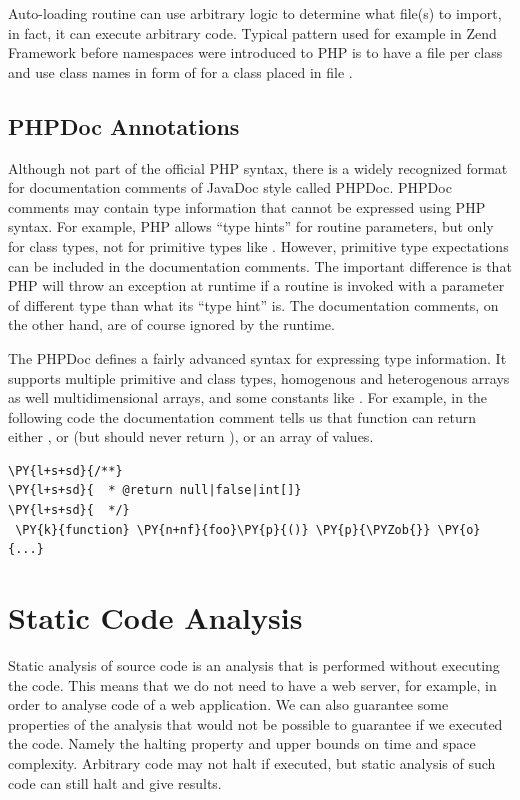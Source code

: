     Auto-loading routine can use arbitrary logic to 
    determine what file(s) to import, in fact, it can 
    execute arbitrary code. Typical 
    pattern used for example in 
    Zend Framework\cite{zendframework} before namespaces were 
    introduced to PHP is to have a file per class and use 
    class names in form of 
     for 
    a class placed in file 
    .
    
    \subsection{PHPDoc Annotations}
    Although not part of the official PHP syntax, 
    there is a widely recognized format for documentation 
    comments of JavaDoc style called PHPDoc. PHPDoc comments 
    may contain type information that cannot be expressed using 
    PHP syntax. For example, PHP allows ``type hints'' 
    for routine parameters, but only for class types, 
    not for primitive types like . However, 
    primitive type expectations can be included in the 
    documentation comments. The important difference 
    is that PHP will throw an exception at runtime if 
    a routine is invoked with a parameter of different 
    type than what its ``type hint'' is. The documentation
    comments, on the other hand, are of course ignored 
    by the runtime.
    
    The PHPDoc defines a fairly advanced syntax for expressing 
    type information. It supports multiple 
    primitive and class types, homogenous and heterogenous arrays as well 
    multidimensional arrays, and some constants like .
    For example, in the following code the documentation 
    comment tells us that function  can return 
    either , or  (but should never 
    return ), or an array of  values.
    
\begin{Verbatim}[commandchars=\\\{\}]
 \PY{l+s+sd}{/**}
\PY{l+s+sd}{  * @return null|false|int[]}
\PY{l+s+sd}{  */}
 \PY{k}{function} \PY{n+nf}{foo}\PY{p}{()} \PY{p}{\PYZob{}} \PY{o}{...}
\end{Verbatim}
    
    \section{Static Code Analysis}       
        Static analysis of source code is an analysis that is performed without 
        executing the code. This means that we do not need to have a
        web server, for example, in order to analyse code of a web application. 
        We can also guarantee some properties of the analysis that would not 
        be possible to guarantee if we executed the code. Namely the halting property and 
        upper bounds on time and space complexity. Arbitrary code may not 
        halt if executed, but static analysis of such code can still halt 
        and give results.
        
